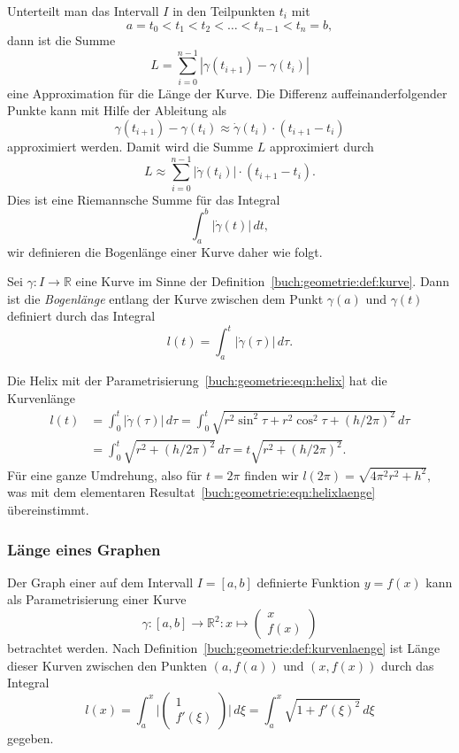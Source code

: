 Unterteilt man das Intervall $I$ in den Teilpunkten $t_i$ mit
\[
a = t_0 < t_1 < t_2 < \dots < t_{n-1} < t_n = b,
\]
dann ist die Summe
\[
L
=
\sum_{i=0}^{n-1} |\gamma(t_{i+1}) - \gamma(t_{i})|
\]
eine Approximation für die Länge der Kurve.
Die Differenz auffeinanderfolgender Punkte kann mit Hilfe der
Ableitung als
\[
\gamma(t_{i+1})-\gamma(t_i)
\approx
\dot{\gamma}(t_{i}) \cdot (t_{i+1}-t_i)
\]
approximiert werden.
Damit wird die Summe $L$ approximiert durch
\[
L\approx \sum_{i=0}^{n-1} |\dot{\gamma}(t_i)| \cdot (t_{i+1}-t_i).
\]
Dies ist eine Riemannsche Summe für das Integral
\[
\int_a^b |\dot{\gamma}(t)|\,dt,
\]
wir definieren die Bogenlänge einer Kurve daher wie folgt.

\begin{definition}
\label{buch:geometrie:def:kurvenlaenge}
Sei $\gamma\colon I\to\mathbb{R}$ eine Kurve im Sinne der
Definition~\ref{buch:geometrie:def:kurve}.
Dann ist die {\em Bogenlänge} entlang der Kurve zwischen dem Punkt
$\gamma(a)$ und $\gamma(t)$ definiert durch das
Integral
\[
l(t) = \int_{a}^t |\dot{\gamma}(\tau)|\,d\tau.
\]
\end{definition}

\begin{beispiel}
Die Helix mit der Parametrisierung~\eqref{buch:geometrie:eqn:helix}
hat die Kurvenlänge
\begin{align*}
l(t)
&=
\int_0^t |\dot{\gamma}(\tau)|\,d\tau
=
\int_0^t \sqrt{r^2\sin^2 \tau + r^2\cos^2\tau + (h/2\pi)^2}\,d\tau
\\
&=
\int_0^t \sqrt{r^2 + (h/2\pi)^2}\,d\tau
=
t\sqrt{r^2+(h/2\pi)^2}.
\end{align*}
Für eine ganze Umdrehung, also für $t=2\pi$ finden wir
\(
l(2\pi) = \sqrt{4\pi^2 r^2 + h^2},
\)
was mit dem elementaren Resultat~\eqref{buch:geometrie:eqn:helixlaenge}
übereinstimmt.
\end{beispiel}

\subsubsection{Länge eines Graphen}
Der Graph einer auf dem Intervall $I=[a,b]$ definierte Funktion
$y=f(x)$ kann als Parametrisierung einer Kurve
\[
\gamma
\colon
[a,b] \to \mathbb{R}^2
:
x \mapsto \begin{pmatrix}x\\f(x)\end{pmatrix}
\]
betrachtet werden.
Nach Definition~\ref{buch:geometrie:def:kurvenlaenge}
ist Länge dieser Kurven zwischen den Punkten $(a,f(a))$ und $(x,f(x))$
durch das Integral
\[
l(x)
=
\int_a^x \biggl| \begin{pmatrix}1\\f'(\xi)\end{pmatrix}\biggr|\,d\xi
=
\int_a^x \sqrt{1+f'(\xi)^2}\,d\xi
\]
gegeben.

